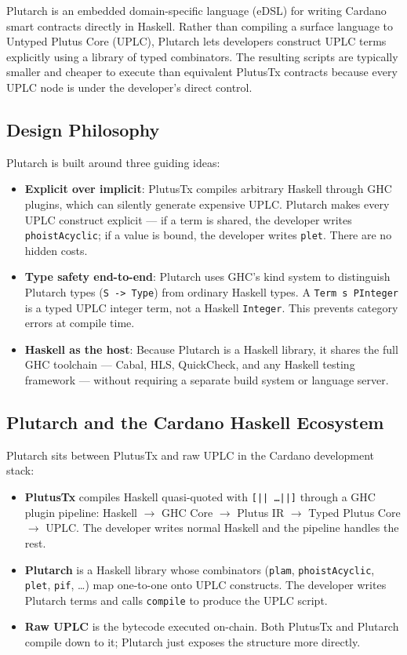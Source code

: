 Plutarch is an embedded domain-specific language (eDSL) for writing Cardano smart contracts directly in Haskell. Rather than compiling a surface language to Untyped Plutus Core (UPLC), Plutarch lets developers construct UPLC terms explicitly using a library of typed combinators. The resulting scripts are typically smaller and cheaper to execute than equivalent PlutusTx contracts because every UPLC node is under the developer's direct control.

\subsection{Design Philosophy}

Plutarch is built around three guiding ideas:

\begin{itemize}
    \item \textbf{Explicit over implicit}: PlutusTx compiles arbitrary Haskell through GHC plugins, which can silently generate expensive UPLC. Plutarch makes every UPLC construct explicit --- if a term is shared, the developer writes \texttt{phoistAcyclic}; if a value is bound, the developer writes \texttt{plet}. There are no hidden costs.
    \item \textbf{Type safety end-to-end}: Plutarch uses GHC's kind system to distinguish Plutarch types (\texttt{S -> Type}) from ordinary Haskell types. A \texttt{Term s PInteger} is a typed UPLC integer term, not a Haskell \texttt{Integer}. This prevents category errors at compile time.
    \item \textbf{Haskell as the host}: Because Plutarch is a Haskell library, it shares the full GHC toolchain --- Cabal, HLS, QuickCheck, and any Haskell testing framework --- without requiring a separate build system or language server.
\end{itemize}

\subsection{Plutarch and the Cardano Haskell Ecosystem}

Plutarch sits between PlutusTx and raw UPLC in the Cardano development stack:

\begin{itemize}
    \item \textbf{PlutusTx} compiles Haskell quasi-quoted with \texttt{[|| \ldots ||]} through a GHC plugin pipeline: Haskell $\to$ GHC Core $\to$ Plutus IR $\to$ Typed Plutus Core $\to$ UPLC. The developer writes normal Haskell and the pipeline handles the rest.
    \item \textbf{Plutarch} is a Haskell library whose combinators (\texttt{plam}, \texttt{phoistAcyclic}, \texttt{plet}, \texttt{pif}, \ldots) map one-to-one onto UPLC constructs. The developer writes Plutarch terms and calls \texttt{compile} to produce the UPLC script.
    \item \textbf{Raw UPLC} is the bytecode executed on-chain. Both PlutusTx and Plutarch compile down to it; Plutarch just exposes the structure more directly.
\end{itemize}


